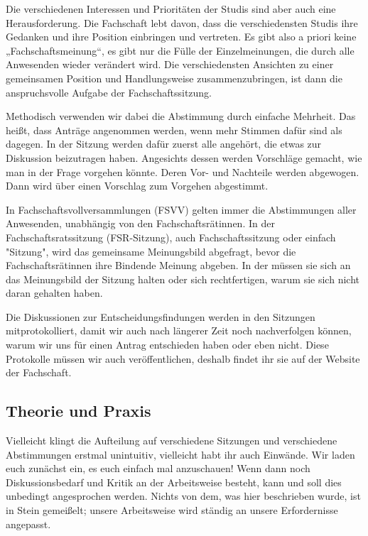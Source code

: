 
Die verschiedenen Interessen und Prioritäten der Studis sind aber auch eine Herausforderung. Die Fachschaft lebt davon, dass die verschiedensten Studis ihre Gedanken und ihre Position einbringen und vertreten. Es gibt also a priori keine „Fachschaftsmeinung“, es gibt nur die Fülle der Einzelmeinungen, die durch alle Anwesenden wieder verändert wird. Die verschiedensten Ansichten zu einer gemeinsamen Position und Handlungsweise zusammenzubringen, ist dann die anspruchsvolle Aufgabe der Fachschaftssitzung.

Methodisch verwenden wir dabei die Abstimmung durch einfache Mehrheit. Das heißt, dass Anträge angenommen werden, wenn mehr Stimmen dafür sind als dagegen. In der Sitzung werden dafür zuerst alle angehört, die etwas zur Diskussion beizutragen haben. Angesichts dessen werden Vorschläge gemacht, wie man in der Frage vorgehen könnte. Deren Vor- und Nachteile werden abgewogen. Dann wird über einen Vorschlag zum Vorgehen abgestimmt. 

In Fachschaftsvollversammlungen (FSVV) gelten immer die Abstimmungen aller Anwesenden, unabhängig von den Fachschaftsrätinnen. In der Fachschaftsratssitzung (FSR-Sitzung), auch Fachschaftssitzung oder einfach "Sitzung", wird das gemeinsame Meinungsbild abgefragt, bevor die Fachschaftsrätinnen ihre Bindende Meinung abgeben. In der müssen sie sich an das Meinungsbild der Sitzung halten oder sich rechtfertigen, warum sie sich nicht daran gehalten haben.

Die Diskussionen zur Entscheidungsfindungen werden in den Sitzungen mitprotokolliert, damit wir auch nach längerer Zeit noch nachverfolgen können, warum wir uns für einen Antrag entschieden haben oder eben nicht. Diese Protokolle müssen wir auch veröffentlichen, deshalb findet ihr sie auf der Website der Fachschaft.




\vspace{-2mm}

\subsection{Theorie und Praxis}
Vielleicht klingt die Aufteilung auf verschiedene Sitzungen und verschiedene Abstimmungen erstmal unintuitiv, vielleicht habt ihr auch Einwände.  Wir laden euch zunächst ein, es euch einfach mal anzuschauen! Wenn dann noch Diskussionsbedarf und Kritik an der Arbeitsweise besteht, kann und soll dies unbedingt angesprochen werden. Nichts von dem, was hier beschrieben wurde, ist in Stein gemeißelt; unsere Arbeitsweise wird ständig an unsere Erfordernisse angepasst.

